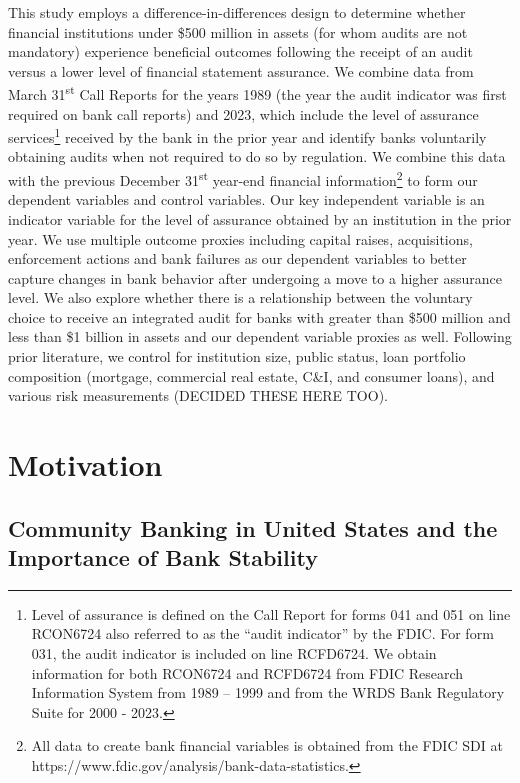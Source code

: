 \documentclass[12pt,letterpaper]{article}
\begin{document}
This study employs a difference-in-differences design to determine whether financial institutions under \$500 million in assets (for whom audits are not mandatory) experience beneficial outcomes following the receipt of an audit versus a lower level of financial statement assurance. We combine data from March 31\textsuperscript{st} Call Reports for the years 1989 (the year the audit indicator was first required on bank call reports) and 2023, which include the level of assurance services\footnote{Level of assurance is defined on the Call Report for forms 041 and 051 on line RCON6724 also referred to as the ``audit indicator'' by the FDIC. For form 031, the audit indicator is included on line RCFD6724. We obtain information for both RCON6724 and RCFD6724 from FDIC Research Information System from 1989 -- 1999 and from the WRDS Bank Regulatory Suite for 2000 - 2023.} received by the bank in the prior year and identify banks voluntarily obtaining audits when not required to do so by regulation. We combine this data with the previous December 31\textsuperscript{st} year-end financial information\footnote{All data to create bank financial variables is obtained from the FDIC SDI at https://www.fdic.gov/analysis/bank-data-statistics.} to form our dependent variables and control variables. Our key independent variable is an indicator variable for the level of assurance obtained by an institution in the prior year. We use multiple outcome proxies including capital raises, acquisitions, enforcement actions and bank failures as our dependent variables to better capture changes in bank behavior after undergoing a move to a higher assurance level. We also explore whether there is a relationship between the voluntary choice to receive an integrated audit for banks with greater than \$500 million and less than \$1 billion in assets and our dependent variable proxies as well. Following prior literature, we control for institution size, public status, loan portfolio composition (mortgage, commercial real estate, C\&I, and consumer loans), and various risk measurements (DECIDED THESE HERE TOO).

\section*{Motivation}

\subsection*{Community Banking in United States and the Importance of Bank Stability}
\end{document}
